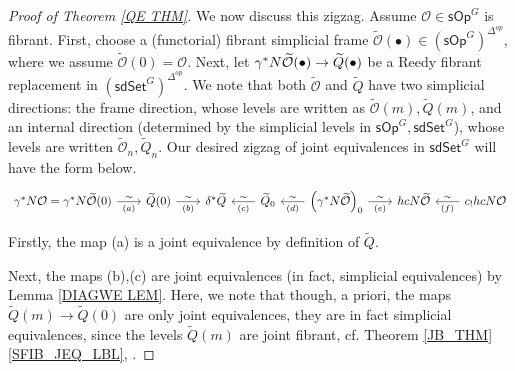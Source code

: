 \documentclass[a4paper,10pt
,draft
]{article}%
\numberwithin{equation}{section}
\numberwithin{figure}{section}
\theoremstyle{definition} %
\renewcommand{\O}{\ensuremath{\mathcal O}}
\newcommand{\1}{\ensuremath{\mathbbm 1}}%
\begin{document}
\begin{proof}[Proof of Theorem \ref{QE THM}]
We now discuss this zigzag. Assume 
$\mathcal{O} \in \mathsf{sOp}^G$ is fibrant.
First, choose a (functorial) fibrant simplicial frame
$\widetilde{\mathcal{O}}(\bullet) \in (\mathsf{sOp}^G)^{\Delta^{op}}$, where we assume $\widetilde{\mathcal{O}} (0) = \mathcal{O}$.
Next, let 
$\gamma^{\**} N \widetilde{\mathcal{O}}(\bullet) 
\to \widetilde{Q}(\bullet)$
be a Reedy fibrant replacement in  
$(\mathsf{sdSet}^G)^{\Delta^{op}}$.
We note that 
both $\widetilde{\O}$ and $\widetilde{Q}$
have two simplicial directions:
the frame direction, whose levels are written as
$\widetilde{\O}(m),\widetilde{Q}(m)$,
and an internal direction
(determined by the simplicial levels in $\mathsf{sOp}^G,\mathsf{sdSet}^G$),
whose levels are written 
$\widetilde{\O}_n,\widetilde{Q}_n$.
Our desired zigzag of joint equivalences in $\mathsf{sdSet}^G$
will have the form below.
\begin{equation}\label{BIGZIG EQ}
\begin{tikzcd}[column sep =20pt]
	\gamma^{\**} N \mathcal{O} =
	\gamma^{\**} N \widetilde{\mathcal{O}} (0)
	\ar{r}{\sim}[swap]{(a)}
&
	\widetilde{Q}(0)
	\ar{r}{\sim}[swap]{(b)}
&
	\delta^{\**} \widetilde{Q}
	\ar[leftarrow]{r}{\sim}[swap]{(c)}
&	
	\widetilde{Q}_0
	\ar[leftarrow]{r}{\sim}[swap]{(d)}
&
	\left(\gamma^{\**} N \widetilde{\mathcal{O}}\right)_0
		\ar{r}{\sim}[swap]{(e)}
&
	hcN \widetilde{\mathcal{O}}
	\ar[leftarrow]{r}{\sim}[swap]{(f)}
&
	c_{!} hcN \mathcal{O}
\end{tikzcd}
\end{equation}

Firstly, the map (a) is a joint equivalence by definition of 
$\widetilde{Q}$.

Next, the maps 
(b),(c) are joint equivalences (in fact, simplicial equivalences)
by Lemma \ref{DIAGWE LEM}. 
Here, we note that though, a priori,
the maps $\widetilde{Q}(m) \to \widetilde{Q}(0)$
are only joint equivalences,
they are in fact simplicial equivalences,
since the levels $\widetilde{Q}(m)$ are joint fibrant,
cf. Theorem \ref{JB_THM}\ref{SFIB_JEQ_LBL},
\cite[Lemma A.29(i)]{BP_edss}.



\end{proof}
\end{document}
